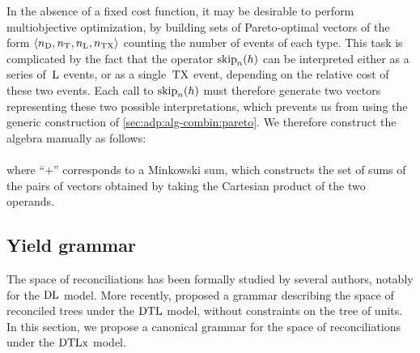 In the absence of a fixed cost function, it may be desirable to perform multiobjective optimization, by building sets of Pareto-optimal vectors of the form \(\left\langle n_{\mathrm{D}}, n_{\mathrm{T}}, n_{\mathrm{L}}, n_{\mathrm{TX}}\right\rangle\) counting the number of events of each type.
This task is complicated by the fact that the operator \(\mathrm{skip}_n(h)\) can be interpreted either as a series of~\(\mathrm{L}\) events, or as a single~\(\mathrm{TX}\) event, depending on the relative cost of these two events.
Each call to \(\mathrm{skip}_n(h)\) must therefore generate two vectors representing these two possible interpretations, which prevents us from using the generic construction of \cref{sec:adp:alg-combin:pareto}.
We therefore construct the algebra manually as follows: \\
\\
where \enquote{\(+\)} corresponds to a Minkowski sum, which constructs the set of sums of the pairs of vectors obtained by taking the Cartesian product of the two operands.

\subsection{Yield grammar}

The space of reconciliations has been formally studied by several authors, notably \textcite{Doyon2009SpaceGeneSpeciesTrees} for the \(\mathrm{D}\mathrm{L}\) model.
More recently, \textcite{Chauve2020CountingSamplingGene} proposed a grammar describing the space of reconciled trees under the \(\mathrm{D}\mathrm{T}\mathrm{L}\) model, without constraints on the tree of units.
In this section, we propose a canonical grammar for the space of reconciliations under the \(\mathrm{D}\mathrm{T}\mathrm{L}\mathrm{x}\) model.

